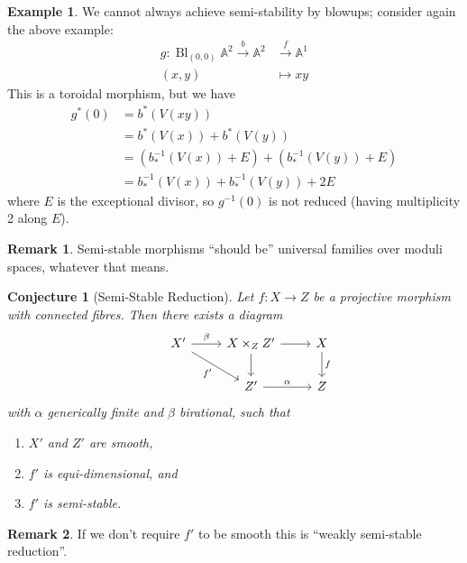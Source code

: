 \documentclass{article}
\newtheorem*{conjecture}{Conjecture}
\theoremstyle{definition}
\newtheorem*{example}{Example}
\newtheorem*{remark}{Remark}
\DeclareMathOperator{\Bl}{Bl}
\newcommand{\A}{\mathbb{A}}
\begin{document}
\begin{example}
    We cannot always achieve semi-stability by blowups; consider again the above
    example:
    \begin{align*}
        g : \Bl_{(0,0)}\A^2 \xrightarrow{b} \A^2 &\xrightarrow{f} \A^1 \\
            (x,y) &\mapsto xy
    \end{align*}
    This is a toroidal morphism, but we have
    \begin{align*}
        g^*(0)
            &= b^*(V(xy)) \\
            &= b^*(V(x)) + b^*(V(y)) \\
            &= (b_*^{-1}(V(x))+E) + (b_*^{-1}(V(y))+E) \\
            &= b_*^{-1}(V(x)) + b_*^{-1}(V(y)) + 2E
    \end{align*}
    where $E$ is the exceptional divisor, so $g^{-1}(0)$ is not reduced (having
    multiplicity 2 along $E$).
\end{example}

\begin{remark}
    Semi-stable morphisms ``should be'' universal families over moduli spaces,
    whatever that means.
\end{remark}

\begin{conjecture}[Semi-Stable Reduction]
    Let $f:X\to Z$ be a projective morphism with connected fibres. Then there
    exists a diagram
    \begin{equation*}
        \begin{tikzcd}
            &X' \ar[r,"\beta"] \ar[dr,"f'",swap]
                &X\times_ZZ' \ar[d] \ar[r] &X \ar[d,"f"] \\
            & &Z' \ar[r,"\alpha"] &Z
        \end{tikzcd}
    \end{equation*}
    with $\alpha$ generically finite and $\beta$ birational, such that
    \begin{enumerate}[label=\arabic*)]
        \item $X'$ and $Z'$ are smooth,
        \item $f'$ is equi-dimensional, and
        \item $f'$ is semi-stable.
    \end{enumerate}
\end{conjecture}

\begin{remark}
    If we don't require $f'$ to be smooth this is ``weakly semi-stable
    reduction''.
\end{remark}
\end{document}
